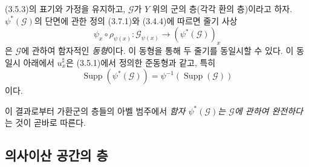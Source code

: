 \begin{env}[3.7.2]
\label{0.3.7.2-ko}
(3.5.3)의 표기와 가정을 유지하고, $\mathcal G$가 $Y$ 위의 군의 층(각각 환의 층)이라고 하자. $\psi^*(\mathcal G)$의 단면에 관한 정의 (3.7.1)와 (3.4.4)에 따르면 줄기 사상
\[
  \psi_x\circ\rho_{\psi(x)}:
  \mathcal G_{\psi(x)}
  \longrightarrow(\psi^*(\mathcal G))_x
\]
은 $\mathcal G$에 관하여 함자적인 \emph{동형}이다. 이 동형을 통해 두 줄기를 동일시할 수 있다. 이 동일시 아래에서 $u_x^\sharp$은 (3.5.1)에서 정의한 준동형과 같고, 특히
\[
  \operatorname{Supp}(\psi^*(\mathcal G))
  =\psi^{-1}(\operatorname{Supp}(\mathcal G))
\]
이다.

이 결과로부터 가환군의 층들의 아벨 범주에서 \emph{함자 $\psi^*(\mathcal G)$는 $\mathcal G$에 관하여 완전하다}는 것이 곧바로 따른다.
\end{env}

\subsection{의사이산 공간의 층}
\label{subsection:0.3.8-ko}


